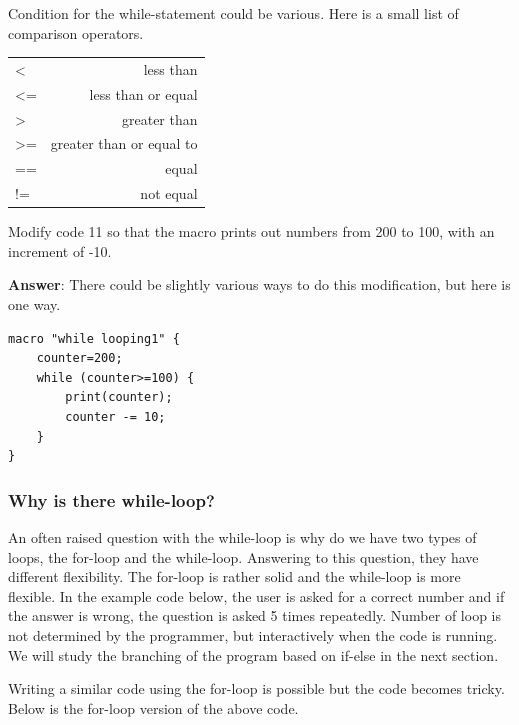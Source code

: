 Condition for the while-statement could be various. Here is a small list of comparison operators.

\begin{indentCom}
 \begin{tabular*}{0.5\textwidth}{ l r }
< & less than \\
<= & less than or equal\\ 
> & greater than\\ 
>= & greater than or equal to\\
== & equal\\
!= & not equal\\
 \end{tabular*}
\end{indentCom}

\begin{indentexercise}{3}
Modify code 11 so that the macro prints out numbers from 200 to 100, with an increment of -10. 

\item \textbf{Answer}: There could be slightly various ways to do this modification, but here is one way. 
	\begin{lstlisting}
macro "while looping1" {
	counter=200;
	while (counter>=100) {
		print(counter);
		counter -= 10;
	}
}
\end{lstlisting}

\end{indentexercise}


\subsubsection{Why is there while-loop?}

An often raised question with the while-loop is why do we have two types of loops, 
the for-loop and the while-loop. Answering to this question, they have different
flexibility. The for-loop is rather solid and the while-loop is more flexible. In the
example code below, the user is asked for a correct number and if the answer is wrong, the
question is asked 5 times repeatedly. Number of loop is not determined by the
programmer, but interactively when the code is running. We will study
the branching of the program based on if-else in the next section.  



Writing a similar code using the for-loop is possible but the code becomes tricky.
Below is the for-loop version of the above code.  

